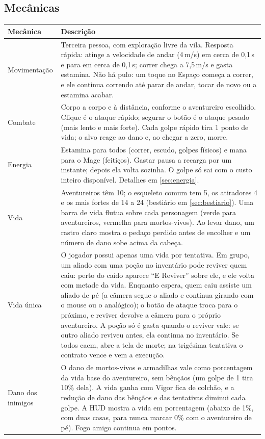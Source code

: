 \documentclass[11pt,a4paper]{article}
\begin{document}
\subsection{Mecânicas}

\begin{xltabular}{\textwidth}{@{}lX@{}}
\toprule
\textbf{Mecânica} & \textbf{Descrição} \\
\midrule
Movimentação & Terceira pessoa, com exploração livre da vila. Resposta rápida: atinge a velocidade de andar (4\,m/s) em cerca de 0,1\,s e para em cerca de 0,1\,s; correr chega a 7,5\,m/s e gasta estamina. Não há pulo: um toque no Espaço começa a correr, e ele continua correndo até parar de andar, tocar de novo ou a estamina acabar. \\
Combate & Corpo a corpo e à distância, conforme o aventureiro escolhido. Clique é o ataque rápido; segurar o botão é o ataque pesado (mais lento e mais forte). Cada golpe rápido tira 1 ponto de vida; o alvo reage ao dano e, ao chegar a zero, morre. \\
Energia & Estamina para todos (correr, escudo, golpes físicos) e mana para o Mage (feitiços). Gastar pausa a recarga por um instante; depois ela volta sozinha. O golpe só sai com o custo inteiro disponível. Detalhes em \ref{sec:energia}. \\
Vida & Aventureiros têm 10; o esqueleto comum tem 5, os atiradores 4 e os mais fortes de 14 a 24 (bestiário em \ref{sec:bestiario}). Uma barra de vida flutua sobre cada personagem (verde para aventureiros, vermelha para mortos-vivos). Ao levar dano, um rastro claro mostra o pedaço perdido antes de encolher e um número de dano sobe acima da cabeça. \\
Vida única & O jogador possui apenas uma vida por tentativa. Em grupo, um aliado com uma poção no inventário pode reviver quem caiu: perto do caído aparece ``E Reviver'' sobre ele, e ele volta com metade da vida. Enquanto espera, quem caiu assiste um aliado de pé (a câmera segue o aliado e continua girando com o mouse ou o analógico); o botão de ataque troca para o próximo, e reviver devolve a câmera para o próprio aventureiro. A poção só é gasta quando o reviver vale: se outro aliado reviveu antes, ela continua no inventário. Se todos caem, abre a tela de morte; na trigésima tentativa o contrato vence e vem a execução. \\
Dano dos inimigos & O dano de mortos-vivos e armadilhas vale como porcentagem da vida base do aventureiro, sem bênçãos (um golpe de 1 tira 10\% dela). A vida ganha com Vigor fica de colchão, e a redução de dano das bênçãos e das tentativas diminui cada golpe. A HUD mostra a vida em porcentagem (abaixo de 1\%, com duas casas, para nunca marcar 0\% com o aventureiro de pé). Fogo amigo continua em pontos. \\

\end{xltabular}
\end{document}

